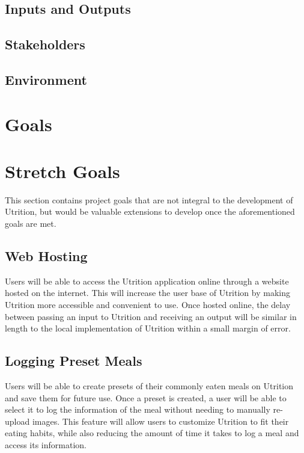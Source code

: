 \documentclass{article}
\begin{document}
\subsection{Inputs and Outputs}


\subsection{Stakeholders}

\subsection{Environment}


\section{Goals}

\section{Stretch Goals}

This section contains project goals that are not integral to the development of Utrition, but would be valuable extensions to develop once the aforementioned goals are met.

\subsection{Web Hosting}

Users will be able to access the Utrition application online through a website hosted on the internet. This will increase the user base of Utrition by making Utrition more accessible and convenient to use. Once hosted online, the delay between passing an input to Utrition and receiving an output will be similar in length to the local implementation of Utrition within a small margin of error.

\subsection{Logging Preset Meals}

Users will be able to create presets of their commonly eaten meals on Utrition and save them for future use. Once a preset is created, a user will be able to select it to log the information of the meal without needing to manually re-upload images. This feature will allow users to customize Utrition to fit their eating habits, while also reducing the amount of time it takes to log a meal and access its information.
\end{document}
